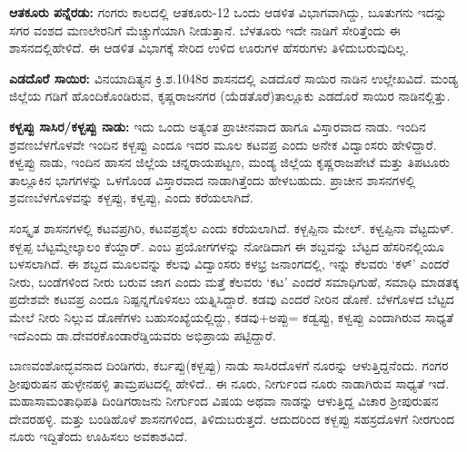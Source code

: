\vskip 2pt

\textbf{ಆತಕೂರು ಪನ್ನೆರಡು:} ಗಂಗರು ಕಾಲದಲ್ಲಿ ಆತಕೂರು-12 ಒಂದು ಆಡಳಿತ ವಿಭಾಗವಾಗಿದ್ದು, ಬೂತುಗನು ಇದನ್ನು ಸಗರ ವಂಶದ ಮಣಲೇರನಿಗೆ ಮೆಚ್ಚುಗೆಯಾಗಿ ನೀಡುತ್ತಾನೆ. ಬೆಳತೂರು ಇದೇ ನಾಡಿಗೆ ಸೇರಿತ್ತೆಂದು ಈ ಶಾಸನದಲ್ಲಿ\break ಹೇಳಿದೆ. ಈ ಆಡಳಿತ ವಿಭಾಗಕ್ಕೆ ಸೇರಿದ ಉಳಿದ ಊರುಗಳ ಹೆಸರುಗಳು ತಿಳಿದುಬರುವುದಿಲ್ಲ.

\vskip 2pt

\textbf{ಎಡದೊರೆ ಸಾಯಿರ:} ವಿನಯಾದಿತ್ಯನ ಕ್ರಿ.ಶ.1048ರ ಶಾಸನದಲ್ಲಿ ಎಡದೊರೆ ಸಾಯಿರ ನಾಡಿನ ಉಲ್ಲೇಖವಿದೆ. ಮಂಡ್ಯ ಜಿಲ್ಲೆಯ ಗಡಿಗೆ ಹೊಂದಿಕೊಂಡಿರುವ, ಕೃಷ್ಣರಾಜನಗರ (ಯೆಡತೊರೆ)ತಾಲ್ಲೂಕು ಎಡದೊರೆ ಸಾಯಿರ ನಾಡಿನಲ್ಲಿತ್ತು.

\vskip 2pt

\textbf{ಕಳ್ಬಪ್ಪು ಸಾಸಿರ/ಕಳ್ಬಪ್ಪು ನಾಡು:} ಇದು ಒಂದು ಅತ್ಯಂತ ಪ್ರಾಚೀನವಾದ ಹಾಗೂ ವಿಸ್ತಾರವಾದ ನಾಡು. ಇಂದಿನ ಶ್ರವಣಬೆಳಗೊಳವೇ ಇಂದಿನ ಕಳ್ಬಪ್ಪು ಎಂದೂ ಇದರ ಮೂಲ ಕಟವಪ್ರ ಎಂದು ಅನೇಕ ವಿದ್ವಾಂಸರು ಹೇಳಿದ್ದಾರೆ. ಕಳ್ವಪ್ಪು ನಾಡು, ಇಂದಿನ ಹಾಸನ ಜಿಲ್ಲೆಯ ಚನ್ನರಾಯಪಟ್ಟಣ, ಮಂಡ್ಯ ಜಿಲ್ಲೆಯ ಕೃಷ್ಣರಾಜಪೇಟೆ ಮತ್ತು ತಿಪಟೂರು ತಾಲ್ಲೂಕಿನ ಭಾಗಗಳನ್ನು ಒಳಗೊಂಡ ವಿಸ್ತಾರವಾದ ನಾಡಾಗಿತ್ತೆಂದು ಹೇಳಬಹುದು. ಪ್ರಾಚೀನ ಶಾಸನಗಳಲ್ಲಿ ಶ್ರವಣಬೆಳಗೊಳವನ್ನು ಕಳ್ಬಪ್ಪು, ಕಳ್ವಪ್ಪು, ಎಂದು ಕರೆಯಲಾಗಿದೆ.

\vskip 2pt

ಸಂಸ್ಕೃತ ಶಾಸನಗಳಲ್ಲಿ ಕಟವಪ್ರಗಿರಿ, ಕಟವಪ್ರಶೈಲ ಎಂದು ಕರೆಯಲಾಗಿದೆ. ಕಳ್ಬಪ್ಪಿನಾ ಮೇಲ್. ಕಳ್ವಪ್ಪಿನಾ ವೆಟ್ಟದುಳ್. ಕಳ್ಬಪ್ಪ ಬೆಟ್ಟಮ್ಮೇಲ್ಕಾಲಂ ಕೆಯ್ದಾರ್. ಎಂಬ ಪ್ರಯೋಗಗಳನ್ನು ನೋಡಿದಾಗ ಈ ಶಬ್ದವನ್ನು ಬೆಟ್ಟದ ಹೆಸರಿ\-ನಲ್ಲಿಯೂ ಬಳಸಲಾಗಿದೆ. ಈ ಶಬ್ದದ ಮೂಲವನ್ನು ಕೆಲವು ವಿದ್ವಾಂಸರು ಕಳಭ್ರ ಜನಾಂಗದಲ್ಲಿ, ಇನ್ನು ಕೆಲವರು ‘ಕಳ್​’ ಎಂದರೆ ನೀರು, ಬಂಡೆಗಳಿಂದ ನೀರು ಬರುವ ಜಾಗ ಎಂದು ಮತ್ತೆ ಕೆಲವರು ‘ಕಟ’ ಎಂದರೆ ಸಮಾಧಿಗುಹೆ, ಸಮಾಧಿ ಮಾಡತಕ್ಕ ಪ್ರದೇಶವೇ ಕಟವಪ್ರ ಎಂದೂ ನಿಷ್ಪನ್ನಗೊಳಿಸಲು ಯತ್ನಿಸಿದ್ದಾರೆ. ಕಡವು ಎಂದರೆ ನೀರಿನ ಡೊಣೆ. ಬೆಳಗೊಳದ ಬೆಟ್ಟದ ಮೇಲೆ ನೀರು ನಿಲ್ಲುವ ಡೊಣೆಗಳು ಬಹುಸಂಖ್ಯೆಯಲ್ಲಿದ್ದು, ಕಡವು+ಅಪ್ಪು= ಕಡ್ವಪ್ಪು, ಕಳ್ವಪ್ಪು ಎಂದಾಗಿರುವ ಸಾಧ್ಯತೆ ಇದೆ\break ಎಂದು ಡಾ.ದೇವರಕೊಂಡಾರೆಡ್ಡಿಯವರು ಅಭಿಪ್ರಾಯ ಪಟ್ಟಿದ್ದಾರೆ.

ಬಾಣವಂಶೋದ್ಭವನಾದ ದಿಂಡಿಗರು, ಕರ್ಬಪ್ಪು(ಕಳ್ಬಪ್ಪು) ನಾಡು ಸಾಸಿರದೊಳಗೆ ನೂರನ್ನು ಆಳುತ್ತಿದ್ದನೆಂದು. ಗಂಗರ ಶ‍್ರೀಪುರುಷನ ಹುಳ್ಳೇನಹಳ್ಳಿ ತಾಮ್ರಪಟದಲ್ಲಿ ಹೇಳಿದೆ.. ಈ ನೂರು, ನೀರ್ಗುಂದ ನೂರು ನಾಡಾಗಿರುವ ಸಾಧ್ಯತೆ ಇದೆ. ಮಹಾಸಾಮಂತಾಧಿಪತಿ ದಿಂಡಿಗರಾಜನು ನೀರ್ಗುಂದ ವಿಷಯ ಅಥವಾ ನಾಡನ್ನು ಆಳುತ್ತಿದ್ದ ವಿಚಾರ ಶ‍್ರೀಪುರುಷನ ದೇವರಹಳ್ಳಿ. ಮತ್ತು ಬಂಡಿಹೊಳೆ ಶಾಸನಗಳಿಂದ, ತಿಳಿದುಬರುತ್ತದೆ. ಆದುದರಿಂದ ಕಳ್ಬಪ್ಪು ಸಹಸ್ರದೊಳಗೆ ನೀರಗುಂದ ನೂರು ಇದ್ದಿತೆಂದು ಊಹಿಸಲು ಅವಕಾಶವಿದೆ.

